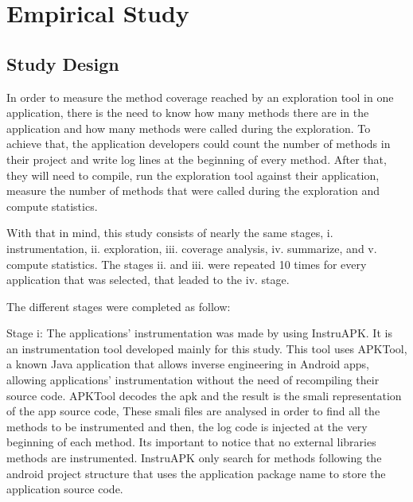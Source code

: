 
\chapter{Empirical Study} %

\label{Chapter5} %

\section{Study Design}

In order to measure the method coverage reached by an exploration tool in one application, there is the need to know how many methods there are in the application and how many methods were called during the exploration. To achieve that, the application developers could count the number of methods in their project and write log lines at the beginning of every method. After that, they will need to compile, run the exploration tool against their application, measure the number of methods that were called during the exploration and compute statistics.

With that in mind, this study consists of nearly the same stages, i. instrumentation, ii. exploration, iii. coverage analysis, iv. summarize, and v. compute statistics. The stages ii. and iii. were repeated 10 times for every application that was selected, that leaded to the iv. stage.

The different stages were completed as follow:

Stage i: The applications' instrumentation was made by using InstruAPK. It is an instrumentation tool developed mainly for this study. This tool uses APKTool, a known Java application that allows inverse engineering in Android apps, allowing applications' instrumentation without the need of recompiling their source code. APKTool decodes the apk and the result is the smali representation of the app source code, These smali files are analysed in order to find all the methods to be instrumented and then, the log code is injected at the very beginning of each method. Its important to notice that no external libraries methods are instrumented. InstruAPK only search for methods following the android project structure that uses the application package name to store the application source code.

